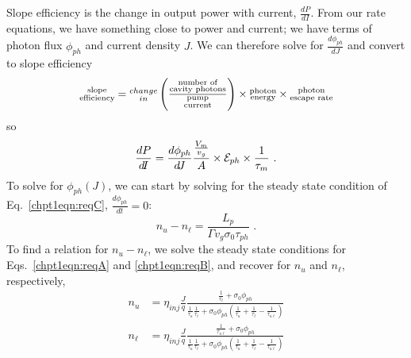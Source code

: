 \documentclass[12pt]{report}
\begin{document}
Slope efficiency is the change in output power with current, $\frac{d P}{dI}$.  From our rate equations, we have something close to power and current; we have terms of photon flux $\phi_{ph}$ and current density $J$.  We can therefore solve for $\frac{d \phi_{ph}}{dJ}$ and convert to slope efficiency
\begin{equation*}
\begin{subarray}{c}\textnormal{slope}\\\textnormal{efficiency}\end{subarray} = \begin{subarray}{c}change\\in\end{subarray} \left( \frac{\begin{subarray}{c}\textnormal{number of}\\\textnormal{cavity photons}\end{subarray}}{\begin{subarray}{c}\textnormal{pump}\\\textnormal{current}\end{subarray}} \right) \times \begin{subarray}{c}\textnormal{photon}\\ \textnormal{energy}\end{subarray} \times \begin{subarray}{c}\textnormal{photon}\\ \textnormal{escape rate}\end{subarray}
\end{equation*}
so
\begin{equation}
\label{chpt1eqn:slope_eff_outline}
\frac{d P}{d\!I} = \frac{d \phi_{ph}}{d\!J} \frac{\frac{V_m}{v_g}}{A} \times \EE_{ph} \times \frac{1}{\tau_m} \text{~.}
\end{equation}
To solve for $\phi_{ph}(J)$, we can start by solving for the steady state condition of Eq.~\eqref{chpt1eqn:reqC}, $\frac{d \phi_{ph}}{d\!t}=0$:
\begin{equation}
\label{chpt1eqn:n_uminusn_l_easy}
n_u-n_\ell=\frac{L_p}{\Gamma v_g \sigma_0 \tau_{ph}} \text{~.}
\end{equation}
To find a relation for $n_u-n_\ell$, we solve the steady state conditions for Eqs.~\eqref{chpt1eqn:reqA} and \eqref{chpt1eqn:reqB}, and recover for $n_u$ and $n_\ell$, respectively,
\begin{subequations}
\begin{align}
\label{chpt1eqn:n_u}
n_u &= \eta_\textit{inj}\frac{J}{q} \frac{\frac{1}{\tau_\ell}+\sigma_0 \phi_{ph}}{\frac{1}{\tau_u} \frac{1}{\tau_\ell}+\sigma_0 \phi_{ph} \left(\frac{1}{\tau_u} + \frac{1}{\tau_\ell} - \frac{1}{\tau_{u\ell}} \right)} \\
\label{chpt1eqn:n_ell}
n_\ell &= \eta_\textit{inj}\frac{J}{q} \frac{\frac{1}{\tau_{u\ell}}+\sigma_0 \phi_{ph}}{\frac{1}{\tau_u} \frac{1}{\tau_\ell}+\sigma_0 \phi_{ph} \left(\frac{1}{\tau_u} + \frac{1}{\tau_\ell} - \frac{1}{\tau_{u\ell}} \right)}
\end{align}
\end{subequations}
\end{document}
